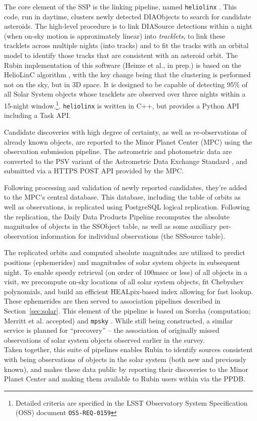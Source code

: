 The core element of the SSP is the linking pipeline, named {\tt heliolinx} \citep{heliolinx}.  
This code, run in daytime, clusters newly detected DIAObjects to search for candidate asteroids.  
The high-level procedure is to link DIASource detections within a night (when on-sky motion is approximately linear) into {\em tracklets}, to link these tracklets across multiple nights (into tracks) and to fit the tracks with an orbital model to identify those tracks that are consistent with an asteroid orbit.  
The Rubin implementation of this software (Heinze et al., in prep.) is based on the HelioLinC algorithm \citep{2018AJ....156..135H}, with the key change being that the clustering is performed not on the sky, but in 3D space.  
It is designed to be capable of detecting 95\% of all Solar System objects whose tracklets are observed over three nights within a 15-night window.\footnote{Detailed criteria are specified in the LSST Observatory System Specification (OSS) document {\tt OSS-REQ-0159}}.  
{\tt heliolinx} is written in C++, but provides a Python API including a Task API.  

Candidate discoveries with high degree of certainty, as well as re-observations of already known objects, are reported to the Minor Planet Center (MPC) using the observation submission pipeline.  
The astrometric and photometric data are converted to the PSV variant of the Astrometric Data Exchange Standard \citep[ADES;][]{2017DPS....4911214C}, and submitted via a HTTPS POST API provided by the MPC.  

Following processing and validation of newly reported candidates, they're added to the MPC's central database.  
This database, including the table of orbits as well as observations, is replicated using PostgreSQL logical replication.  
Following the replication, the Daily Data Products Pipeline recomputes the absolute magnitudes of objects in the SSObject table, as well as some auxiliary per-observation information for individual observations (the SSSource table).  

The replicated orbits and computed absolute magnitudes are utilized to predict positions (ephemerides) and magnitudes of solar system objects in subsequent night.  
To enable speedy retrieval (on order of 100msec or less) of all objects in a visit, we precompute on-sky locations of all solar system objects, fit Chebyshev polynomials, and build an efficient HEALpix-based index allowing for fast lookup.  
These ephemerides are then served to association pipelines described in Section~\ref{sec:solar}.  
This element of the pipeline is based on Sorcha (computation; Merritt et al. accepted) and {\tt mpsky} \citep[fast lookup and serving;][]{mpsky}.  
While still being constructed, a similar service is planned for ``precovery'' -- the association of originally missed observations of solar system objects observed earlier in the survey.  
\\

Taken together, this suite of pipelines enables Rubin to identify sources consistent with being observations of objects in the solar system (both new and previously known), and makes these data public by reporting their discoveries to the Minor Planet Center and making them available to Rubin users within via the PPDB.
